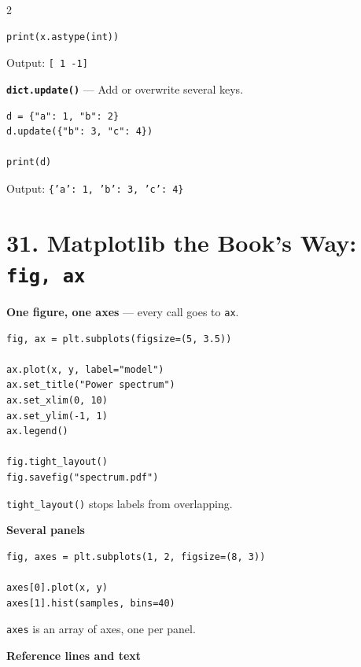 \documentclass[10pt,a4paper]{article}
\begin{document}
\begin{multicols}{2}
\begin{card}
\begin{lstlisting}[style=pythonstyle]
print(x.astype(int))
\end{lstlisting}

Output:
\texttt{[ 1 -1]}
\end{card}

\begin{card}
\textbf{\texttt{dict.update()}} --- Add or overwrite several keys.

\begin{lstlisting}[style=pythonstyle]
d = {"a": 1, "b": 2}
d.update({"b": 3, "c": 4})

print(d)
\end{lstlisting}

Output:
\texttt{\{'a': 1, 'b': 3, 'c': 4\}}
\end{card}

\section*{31. Matplotlib the Book's Way: \texttt{fig, ax}}

\begin{card}
\textbf{One figure, one axes} --- every call goes to \texttt{ax}.

\begin{lstlisting}[style=pythonstyle]
fig, ax = plt.subplots(figsize=(5, 3.5))

ax.plot(x, y, label="model")
ax.set_title("Power spectrum")
ax.set_xlim(0, 10)
ax.set_ylim(-1, 1)
ax.legend()

fig.tight_layout()
fig.savefig("spectrum.pdf")
\end{lstlisting}

\texttt{tight\_layout()} stops labels from overlapping.
\end{card}

\begin{card}
\textbf{Several panels}

\begin{lstlisting}[style=pythonstyle]
fig, axes = plt.subplots(1, 2, figsize=(8, 3))

axes[0].plot(x, y)
axes[1].hist(samples, bins=40)
\end{lstlisting}

\texttt{axes} is an array of axes, one per panel.
\end{card}

\begin{card}
\textbf{Reference lines and text}


\end{card}
\end{multicols}
\end{document}
